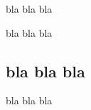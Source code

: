 \documentclass[12pt]{article}
\begin{document}
\tableofcontents

bla bla bla

bla bla bla

\subsection{bla bla bla}
bla bla bla
\end{document}

